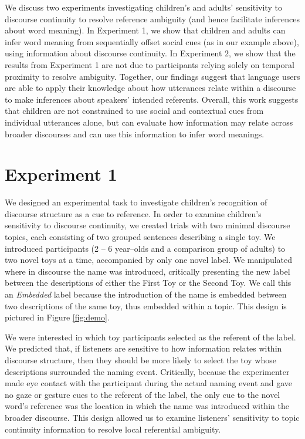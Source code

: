\documentclass[man]{apa2}
\begin{document}
We discuss two experiments investigating children's and adults' sensitivity to discourse continuity to resolve reference ambiguity (and hence facilitate inferences about word meaning). In Experiment 1, we show that children and adults can infer word meaning from sequentially offset social cues (as in our example above), using information about discourse continuity.  In Experiment 2, we show that the results from Experiment 1 are not due to participants relying solely on temporal proximity to resolve ambiguity.  Together, our findings suggest that language users are able to apply their knowledge about how utterances relate within a discourse to make inferences about speakers' intended referents.  Overall, this work suggests that children are not constrained to use social and contextual cues from individual utterances alone, but can evaluate how information may relate across broader discourses and can use this information to infer word meanings.

\section{Experiment 1}

We designed an experimental task to investigate children's recognition of discourse structure as a cue to reference. In order to examine children's sensitivity to discourse continuity, we created trials with two minimal discourse topics, each consisting of two grouped sentences describing a single toy.  We introduced participants (2 -- 6 year--olds and a comparison group of adults) to two novel toys at a time, accompanied by only one novel label.  We manipulated where in discourse the name was introduced, critically presenting the new label between the descriptions of either the First Toy or the Second Toy.  We call this an \emph{Embedded} label because the introduction of the name is embedded between two descriptions of the same toy, thus embedded within a topic.  This design is pictured in Figure \ref{fig:demo}.

We were interested in which toy participants selected as the referent of the label.  We predicted that, if listeners are sensitive to how information relates within discourse structure, then they should be more likely to select the toy whose descriptions surrounded the naming event.  Critically, because the experimenter made eye contact with the participant during the actual naming event and gave no gaze or gesture cues to the referent of the label, the only cue to the novel word's reference was the location in which the name was introduced within the broader discourse.  This design allowed us to examine listeners' sensitivity to topic continuity information to resolve local referential ambiguity.  
\end{document}
